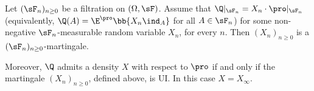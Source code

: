 \begin{lemma}\label{lem:martingale_density_ui_discrete}
Let $(\sF_n)_{n \geq 0}$ be a filtration on $(\Omega,\sF)$. %
Assume that $\Q|_{\sF_n} = X_n \cdot \pro|_{\sF_n}$ (equivalently, $\Q(A) = \E^\pro\bb{X_n \ind_A}$ for all $A\in \sF_n$) for some non-negative $\sF_n$-measurable random variable $X_n$, for every $n$. Then $(X_n)_{n \geq 0}$ is a $(\sF_n)_{n\geq 0}$-martingale.


Moreover, $\Q$ admits a density $X$ with respect to $\pro$ if and only if the martingale $(X_n)_{n \geq 0}$, defined above, is UI. In this case $X = X_\infty$.
\end{lemma}
